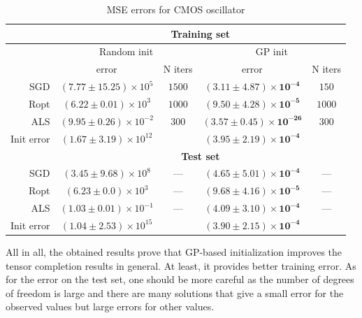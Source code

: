 \begin{table}[]
    \centering
    \caption{MSE errors for CMOS oscillator}
    \label{tab:results_cmos}
    \begin{tabular}{r|cc|cc|}
         & \multicolumn{4}{c|}{\textbf{Training set}} \\
        \hline
        & \multicolumn{2}{c|}{Random init} & \multicolumn{2}{c|}{GP init} \\
        & error & N iters & error & N iters \\
        \hline
        SGD & $(7.77 \pm 15.25) \times 10^5$ & $1500$ &
        $\mathbf{(3.11 \pm 4.87) \times 10^{-4}}$ & $150$ \\

        Ropt & $(6.22 \pm 0.01) \times 10^3$ & $1000$ &
        $\mathbf{(9.50 \pm 4.28) \times 10^{-5}}$ & $1000$ \\

        ALS & $(9.95 \pm 0.26) \times 10^{-2}$ & $300$ &
        $\mathbf{(3.57 \pm 0.45) \times 10^{-26}}$ & $300$ \\
        \hline
        Init error & $(1.67 \pm 3.19) \times 10^{12}$ & &
        $\mathbf{(3.95 \pm 2.19) \times 10^{-4}}$ & \\
        \hline

         & \multicolumn{4}{c|}{\textbf{Test set}} \\
        \hline

        SGD & $(3.45 \pm 9.68) \times 10^8$ & --- &
        $\mathbf{(4.65 \pm 5.01) \times 10^{-4}}$ & --- \\

        Ropt & $(6.23 \pm 0.0) \times 10^3$ & --- &
        $\mathbf{(9.68 \pm 4.16) \times 10^{-5}}$ & --- \\

        ALS & $(1.03 \pm 0.01) \times 10^{-1}$ & --- &
        $\mathbf{(4.09 \pm 3.10) \times 10^{-4}}$ & --- \\
        \hline
        Init error & $(1.04 \pm 2.53) \times 10^{15}$ & &
        $\mathbf{(3.90 \pm 2.15) \times 10^{-4}}$ & \\
        \hline
    \end{tabular}
\end{table}



All in all, the obtained results prove that GP-based initialization improves the tensor completion results in general. At least, it provides better training error. As for the error on the test set, one should be more careful as the number of degrees of freedom is large and there are many solutions that give a small error for the observed values but large errors for other values.



